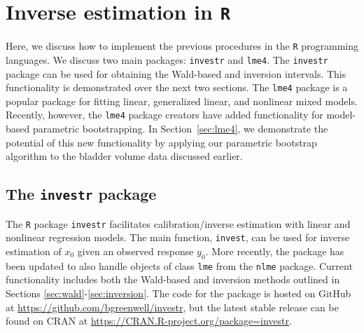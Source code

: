 \documentclass{article}\usepackage[]{graphicx}\usepackage[]{color}
\begin{document}



\appendix


\section[Inverse estimation in R]{Inverse estimation in \texttt{R}}
\label{sec:R}

Here, we discuss how to implement the previous procedures in the \texttt{R} programming languages.  We discuss two main packages: \texttt{investr} and \texttt{lme4}.  The \texttt{investr} package can be used for obtaining the Wald-based and inversion intervals.  This functionality is demonstrated over the next two sections.  The \texttt{lme4} package is a popular package for fitting linear, generalized linear, and nonlinear mixed models. Recently, however, the \texttt{lme4} package creators have added functionality for model-based parametric bootstrapping.  In Section~\ref{sec:lme4}, we demonstrate the potential of this new functionality by applying our parametric bootstrap algorithm to the bladder volume data discussed earlier.

\subsection[The investr package]{The \texttt{investr} package}

The \texttt{R} package \texttt{investr} facilitates calibration/inverse estimation with linear and nonlinear regression models.  The main function, \texttt{invest}, can be used for inverse estimation of $x_0$ given an observed response $y_0$.  More recently, the package has been updated to also handle objects of class \texttt{lme} from the \texttt{nlme} package.  Current functionality includes both the Wald-based and inversion methods outlined in Sections \ref{sec:wald}-\ref{sec:inversion}.  The code for the package is hosted on GitHub at \url{https://github.com/bgreenwell/investr}, but the latest stable release can be found on CRAN at \url{https://CRAN.R-project.org/package=investr}.
\end{document}
